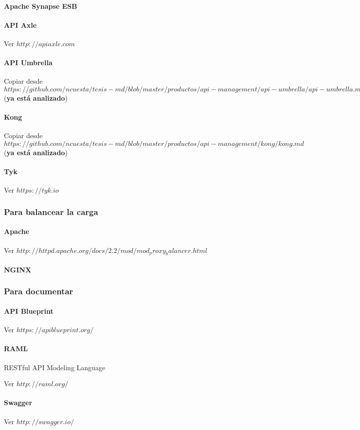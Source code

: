 \paragraph{Apache Synapse ESB}

\paragraph{API Axle}

Ver $http://apiaxle.com$

\paragraph{API Umbrella}

Copiar desde $https://github.com/ncuesta/tesis-md/blob/master/productos/api-management/api-umbrella/api-umbrella.md$ (\textbf{ya está analizado})

\paragraph{Kong}

Copiar desde $https://github.com/ncuesta/tesis-md/blob/master/productos/api-management/kong/kong.md$ (\textbf{ya está analizado})

\paragraph{Tyk}

Ver $https://tyk.io$


\subsubsection{Para balancear la carga}

\paragraph{Apache}

Ver $http://httpd.apache.org/docs/2.2/mod/mod_proxy_balancer.html$

\paragraph{NGINX}


\subsubsection{Para documentar}

\paragraph{API Blueprint}

Ver $https://apiblueprint.org/$

\paragraph{RAML}

RESTful API Modeling Language

Ver $http://raml.org/$

\paragraph{Swagger}

Ver $http://swagger.io/$
